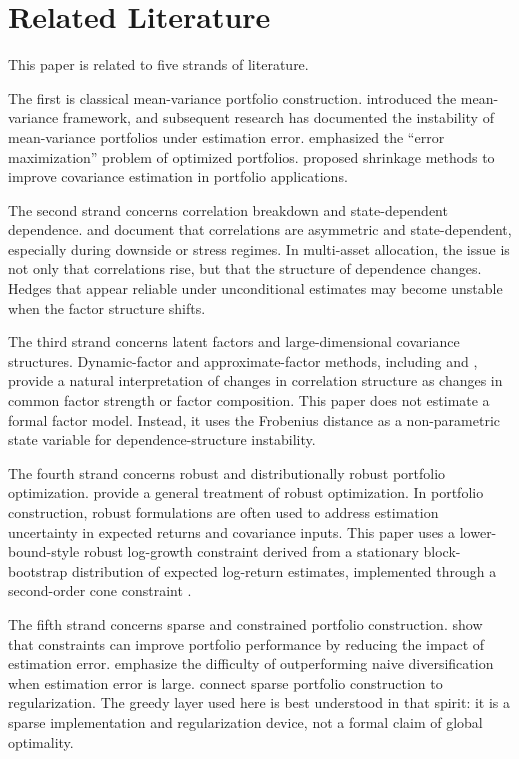 \documentclass[11pt]{article}
\begin{document}
\section{Related Literature}
\label{sec:related}

This paper is related to five strands of literature.

The first is classical mean-variance portfolio construction. \citet{markowitz1952} introduced the mean-variance framework, and subsequent research has documented the instability of mean-variance portfolios under estimation error. \citet{michaud1989} emphasized the ``error maximization'' problem of optimized portfolios. \citet{ledoitwolf2004} proposed shrinkage methods to improve covariance estimation in portfolio applications.

The second strand concerns correlation breakdown and state-dependent dependence. \citet{longinsolnik2001} and \citet{angchen2002} document that correlations are asymmetric and state-dependent, especially during downside or stress regimes. In multi-asset allocation, the issue is not only that correlations rise, but that the structure of dependence changes. Hedges that appear reliable under unconditional estimates may become unstable when the factor structure shifts.

The third strand concerns latent factors and large-dimensional covariance structures. Dynamic-factor and approximate-factor methods, including \citet{forni2000} and \citet{stockwatson2002}, provide a natural interpretation of changes in correlation structure as changes in common factor strength or factor composition. This paper does not estimate a formal factor model. Instead, it uses the Frobenius distance as a non-parametric state variable for dependence-structure instability.

The fourth strand concerns robust and distributionally robust portfolio optimization. \citet{bental2009} provide a general treatment of robust optimization. In portfolio construction, robust formulations are often used to address estimation uncertainty in expected returns and covariance inputs. This paper uses a lower-bound-style robust log-growth constraint derived from a stationary block-bootstrap distribution of expected log-return estimates, implemented through a second-order cone constraint \citep{politisromano1994}.

The fifth strand concerns sparse and constrained portfolio construction. \citet{jagannathanma2003} show that constraints can improve portfolio performance by reducing the impact of estimation error. \citet{demiguel2009} emphasize the difficulty of outperforming naive diversification when estimation error is large. \citet{brodie2009} connect sparse portfolio construction to regularization. The greedy layer used here is best understood in that spirit: it is a sparse implementation and regularization device, not a formal claim of global optimality.
\end{document}

